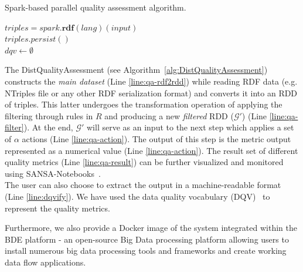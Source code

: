 \begin{algorithm}
\caption{Spark-based parallel quality assessment algorithm.}
\label{alg:DistQualityAssessment}
    $\textit{triples} = spark.\textbf{rdf}(lang)(input)$ \label{line:qa-rdf2rdd} \\
    $\textit{triples}.persist()$ \label{line:qa-cache}\\
    $dqv \leftarrow \emptyset$ \\
 \label{line:qa-result}
\end{algorithm}

The DistQualityAssessment (see Algorithm~\ref{alg:DistQualityAssessment}) constructs the \emph{main dataset} (Line \ref{line:qa-rdf2rdd}) while reading \gls{RDF} data (e.g. NTriples file or any other \gls{RDF} serialization format) and converts it into an \gls{RDD} of triples.
This latter undergoes the transformation operation of applying the filtering through rules in $R$ and producing a new \emph{filtered} \gls{RDD} ($\mathcal{G'}$) (Line \ref{line:qa-filter}).
At the end, $\mathcal{G'}$ will serve as an input to the next step which applies a set of $\alpha$ actions (Line \ref{line:qa-action}).
The output of this step is the metric output represented as a numerical value (Line \ref{line:qa-action}). 
The result set of different quality metrics (Line \ref{line:qa-result}) can be further visualized and monitored using SANSA-Notebooks~\cite{iermilov-2017-sansa-iswc-demo}.\\
The user can also choose to extract the output in a machine-readable format (Line \ref{line:dqvify}). 
We have used the data quality vocabulary (DQV)~\cite{Isaac:16:dqv} to represent the quality metrics. 

Furthermore, we also provide a Docker image of the system integrated within the BDE platform - an open-source Big Data processing platform allowing users to install numerous big data processing tools and frameworks and create working data flow applications.

